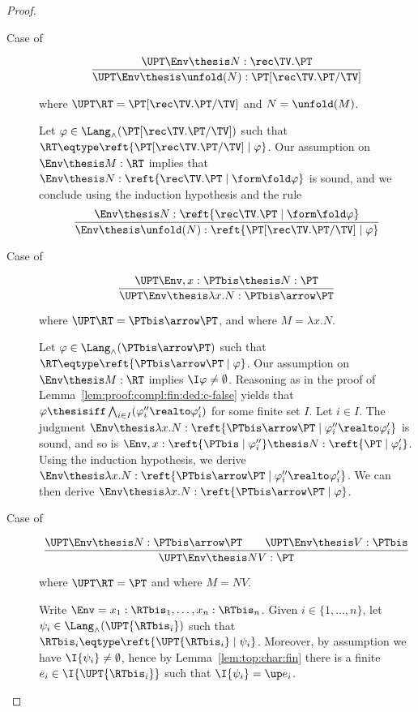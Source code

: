 \begin{proof}
\begin{description}
\item[Case of]
\[
\dfrac{\UPT\Env \thesis N : \rec\TV.\PT}
  {\UPT\Env \thesis \unfold(N) : \PT[\rec\TV.\PT/\TV]}
\]

\noindent
where $\UPT\RT = \PT[\rec\TV.\PT/\TV]$
and $N = \unfold(M)$.

Let $\varphi \in \Lang_\land(\PT[\rec\TV.\PT/\TV])$
such that
$\RT \eqtype \reft{\PT[\rec\TV.\PT/\TV] \mid \varphi}$.
Our assumption on $\Env \thesis M : \RT$
implies that 
$\Env \thesis N : \reft{\rec\TV.\PT \mid \form\fold \varphi}$
is sound,
and we conclude using the induction hypothesis and the rule
\[
\dfrac{\Env \thesis N : \reft{\rec\TV.\PT \mid \form\fold \varphi}}
  {\Env \thesis \unfold(N) : \reft{\PT[\rec\TV.\PT/\TV] \mid \varphi}}
\]

\item[Case of]
\[
\dfrac{\UPT\Env,x:\PTbis \thesis N : \PT}
  {\UPT\Env \thesis \lambda x.N : \PTbis \arrow \PT}
\]

\noindent
where $\UPT\RT = \PTbis \arrow \PT$,
and where $M = \lambda x.N$.

Let $\varphi \in \Lang_\land(\PTbis \arrow \PT)$
such that
$\RT \eqtype \reft{\PTbis \arrow \PT \mid \varphi}$.
Our assumption on $\Env \thesis M : \RT$
implies $\I\varphi \neq \emptyset$.
Reasoning as in the proof of Lemma~\ref{lem:proof:compl:fin:ded:c-false}
yields that $\varphi \thesisiff \bigwedge_{i \in I}(\varphi''_i \realto \varphi'_i)$
for some finite set $I$.
Let $i \in I$.
The judgment
\(
  \Env
  \thesis
  \lambda x.N
  :
  \reft{\PTbis \arrow \PT \mid \varphi''_i \realto \varphi'_i}
\)
is sound,
and so is
\(
  \Env, x : \reft{\PTbis \mid \varphi''_i}
  \thesis
  N
  :
  \reft{\PT \mid \varphi'_i}
\).
Using the induction hypothesis, we derive
\(
  \Env
  \thesis
  \lambda x.N
  :
  \reft{\PTbis \arrow \PT \mid \varphi''_i \realto \varphi'_i}
\).
We can then derive
\(
  \Env
  \thesis
  \lambda x.N
  :
  \reft{\PTbis \arrow \PT \mid \varphi}
\).


\item[Case of]
\[
\dfrac{\UPT\Env \thesis N : \PTbis \arrow \PT
  \qquad
  \UPT\Env \thesis V : \PTbis}
  {\UPT\Env \thesis N V : \PT}
\]

\noindent
where $\UPT\RT = \PT$ and where $M = N V$.

Write $\Env = x_1:\RTbis_1,\dots,x_n:\RTbis_n$.
Given $i \in \{1,\dots,n\}$,
let $\psi_i \in \Lang_\land(\UPT{\RTbis_i})$
such that $\RTbis_i \eqtype \reft{\UPT{\RTbis_i} \mid \psi_i}$.
Moreover, by assumption we have $\I{\psi_i} \neq \emptyset$,
hence by Lemma~\ref{lem:top:char:fin}
there is a finite $e_i \in \I{\UPT{\RTbis_i}}$
such that $\I{\psi_i} = \up e_i$.


\end{description}
\end{proof}
